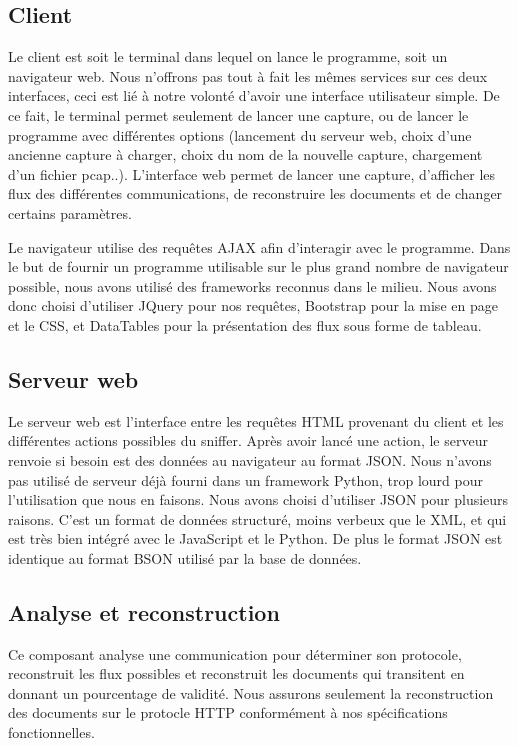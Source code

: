 \subsection{Client}
Le client est soit le terminal dans lequel on lance le programme, soit un navigateur web. Nous n'offrons pas tout à fait les mêmes services sur ces deux interfaces, ceci est lié à notre volonté d'avoir une interface utilisateur simple. 
De ce fait, le terminal permet seulement de lancer une capture, ou de lancer le programme avec différentes options (lancement du serveur web, choix d'une ancienne capture à charger, choix du nom de la nouvelle capture, chargement d'un fichier pcap..).
L'interface web permet de lancer une capture, d'afficher les flux des différentes communications, de reconstruire les documents et de changer certains paramètres.

Le navigateur utilise des requêtes AJAX afin d'interagir avec  le programme.
Dans le but de fournir un programme utilisable sur le plus grand nombre de navigateur possible, nous avons utilisé des frameworks reconnus dans le milieu. Nous avons donc choisi d'utiliser JQuery pour nos requêtes, Bootstrap pour la mise en page et le CSS, et DataTables pour la présentation des flux sous forme de tableau. 

\subsection{Serveur web}
Le serveur web est l'interface entre les requêtes HTML provenant du client et les différentes actions possibles du sniffer. Après avoir lancé une action, le serveur renvoie si besoin est des données au navigateur au format
JSON. Nous n'avons pas utilisé de serveur déjà fourni dans un framework Python, trop lourd pour l'utilisation que nous en faisons.
Nous avons choisi d'utiliser JSON pour plusieurs raisons. C'est un format de données structuré, moins verbeux que le XML, et qui est très bien intégré avec le JavaScript et le Python. De plus le format JSON est identique au format BSON utilisé par la base de données. 

\subsection{Analyse et reconstruction}
Ce composant analyse une communication pour déterminer son protocole, reconstruit les flux possibles et reconstruit les documents qui transitent en donnant un pourcentage de validité. Nous assurons seulement la reconstruction des documents sur le protocle HTTP conformément à nos spécifications fonctionnelles.

